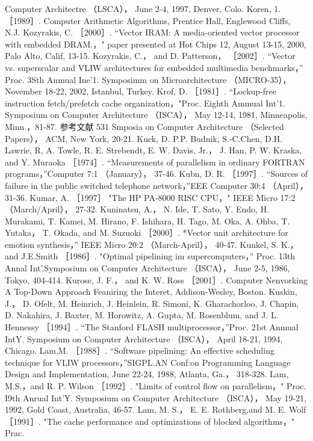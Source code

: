 Computer Architectre （LSCA）， June 2-4, 1997, Denver, Colo.
Koren, 1. ［1989］. Computer Arithmetic Algorithms, Prentice Hall, Englewood Cliffs, N.J.
Kozyrakis, C. ［2000］. “Vector IRAM: A media-oriented vector processor with embedded
DRAM.，" paper presented at Hot Chips 12, August 13-15, 2000, Palo Alto, Calif, 13-15.
Kozyrakis, C.， and D. Patterson， ［2002］. “Vector vs. superscalar and VLIW architectures for embedded multimedia benchmarks，”
Proc. 3Sth Anmual Ine'1. Symposimm on Microarchitecture （MICRO-35）， November 18-22, 2002, Istanbul, Turkey.
Krof, D. ［1981］. “Lockup-free instruction fetch/prefetch cache organization，"Proc. Eighth Ammual Int'1. Symposium on
Computer Architecture （ISCA）， May 12-14, 1981, Minneapolis, Minn.，81-87.
参考文献
531
Smposia on Computer Architecture （Selected Papers）， ACM, New York, 20-21.
Kuck, D. P.P. Budnik, S.-C.Chen, D.H. Lawrie, R, A. Towle, R. E. Strebendt, E. W. Davis, Jr.， J. Han, P. W. Kraska, and Y.
Muraoka ［1974］. “Measurements of parallelism in ordinary FORTRAN programs，”Computer 7:1 （January）， 37-46.
Kubn, D. R. ［1997］. “Sources of failure in the public switched telephone network，”EEE Computer 30:4 （April）， 31-36.
Kumar, A. ［1997］ "The HP PA-8000 RISC CPU，" IEEE Micro 17:2 （March/April）， 27-32.
Kuninatsu, A.， N. Ide, T. Sato, Y. Endo, H. Murakami, T. Kamei, M. Hirano, F. Ishihara, H. Tago, M. Oka, A. Ohba, T. Yutaka，
T. Okada, and M. Suzuoki ［2000］. *Vector unit architecture for emotion synthesis，” IEEE Micro 20:2 （March-April）， 40-47.
Kunkel, S. K.， and J.E.Smith ［1986］. "Optimal pipelining im supercomputers，” Proc. 13th Annal Int'.Symposium on Computer
Architecture （ISCA）， June 2-5, 1986, Tokyo, 404-414.
Kurose, J. F.， and K. W. Ross ［2001］. Computer Nenvorking A Top-Down Approach Feaniring the Interet, Addison-Wesley, Boston.
Kuskin, J.， D. Ofelt, M. Heinrich, J. Heinlein, R. Simoni, K. Gharachorloo, J. Chapin, D. Nakahira, J. Baxter, M. Horowitz, A.
Gupta, M. Rosenblum, and J. L. Hennessy ［1994］. “The Stanford FLASH multiprocessor，”Proc. 21st Anmual IntY.
Symposium on Computer Architecture （ISCA）， April 18-21, 1994, Chicago.
Lam,M. ［1988］. “Software pipelining: An effective scheduling technique for VLIW processors，”SIGPL.AN Conf:on
Programming Language Design and Implementation, June 22-24, 1988, Atlanta, Ga.， 318-328.
Lam, M.S.，and R. P. Wilson ［1992］. "Limits of control flow on parallelism，" Proc. I9th Anrual Int'Y. Symposium on Computer
Architecture （ISCA）， May 19-21, 1992, Gold Coast, Australia, 46-57.
Lam, M. S.， E. E. Rothberg,and M. E. Wolf ［1991］. "The cache performance and optimizations of blocked algorithms，" Prac.
